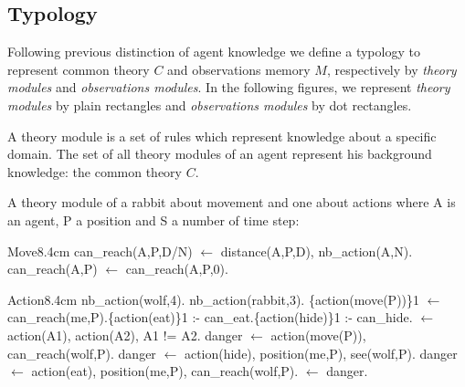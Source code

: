 \documentclass{aamas2012}
\begin{document}
\subsection{Typology}

	Following previous distinction of agent knowledge we define a typology to represent common theory $C$ and observations memory $M$,
	respectively by \emph{theory modules} and \emph{observations modules}.
	In the following figures, we represent \emph{theory modules} by plain rectangles and \emph{observations modules} by dot rectangles.

	\begin{definition}
		A theory module is a set of rules which represent knowledge about a specific domain.
		The set of all theory modules of an agent represent his background knowledge: the common theory $C$.
	\end{definition}
	
	\begin{example}
		\label{theory_example}
		
		A theory module of a rabbit about movement and one about actions where A is an agent, P a position and S a number of time step:\newline
		\begin{module}{Move}{8.4cm}
			can\_reach(A,P,D/N) $\leftarrow$ distance(A,P,D), nb\_action(A,N).\newline
			can\_reach(A,P) $\leftarrow$ can\_reach(A,P,0).
		\end{module}
		
		\begin{module}{Action}{8.4cm}
			nb\_action(wolf,4).\newline
			nb\_action(rabbit,3).\newline
			\{action(move(P))\}1 $\leftarrow$ can\_reach(me,P).\{action(eat)\}1 :- can\_eat.\{action(hide)\}1 :- can\_hide.\newline
			\newline
			$\leftarrow$ action(A1), action(A2), A1 != A2.\newline
			danger $\leftarrow$ action(move(P)), can\_reach(wolf,P).\newline
			danger $\leftarrow$ action(hide), position(me,P), see(wolf,P).\newline
			danger $\leftarrow$ action(eat), position(me,P), can\_reach(wolf,P).\newline
			$\leftarrow$ danger.
		\end{module}
		
	\end{example}
	
\end{document}
